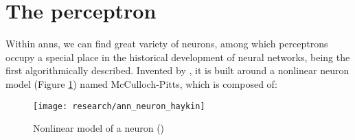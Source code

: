 


                                                                                    


\section{The perceptron}
\label{sec:perceptron}
Within \glspl{ann}, we can find great variety of neurons, among which perceptrons occupy a special place in the historical development of neural networks, being the first algorithmically described. Invented by \cite{rosenblatt1958perceptron}, it is built around a nonlinear neuron model (Figure \ref{fig:nonlinear_neuron_model}) named McCulloch-Pitts, which is composed of:

\begin{figure}[!ht]
	\centering
	\texttt{[image: research/ann\_neuron\_haykin]}
	\caption{Nonlinear model of a neuron (\cite{haykin2009neural})}
	\label{fig:nonlinear_neuron_model}
\end{figure}

